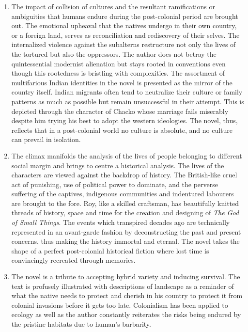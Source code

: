 \begin{enumerate}
  \item The impact of collision of cultures and the resultant ramifications or ambiguities that humans endure during the post-colonial period are brought out.  The emotional upheaval that the natives undergo in their own country, or a foreign land, serves as reconciliation and rediscovery of their selves.  The internalized violence against the subalterns restructure not only the lives of the tortured but also the oppressors. The author does not betray the quintessential modernist alienation but stays rooted in conventions even though this rootedness is bristling with complexities. The assortment of multifarious Indian identities in the novel is presented as the mirror of the country itself.  Indian migrants often tend to neutralize their culture or family patterns as much as possible but remain unsuccessful in their attempt. This is depicted through the character of Chacko whose marriage fails miserably despite him trying his best to adopt the western ideologies. The novel, thus, reflects that in a post-colonial world no culture is absolute, and no culture can prevail in isolation.

  \item The climax manifolds the analysis of the lives of people belonging to different social margin and brings to centre a historical analysis.  The lives of the characters are viewed against the backdrop of history.  The British-like cruel act of punishing, use of political power to dominate, and the perverse suffering of the captives, indigenous communities and indentured labourers are brought to the fore.  Roy, like a skilled craftsman, has beautifully knitted threads of history, space and time for the creation and designing of \emph{The God of Small Things}.  The events which transpired decades ago are technically represented in an avant-garde fashion by deconstructing the past and present concerns, thus making the history immortal and eternal. The novel takes the shape of a perfect post-colonial historical fiction where lost time is convincingly recreated through memories.

  \item The novel is a tribute to accepting hybrid variety and inducing survival.  The text is profusely illustrated with descriptions of landscape as a reminder of what the native needs to protect and cherish in his country to protect it from colonial invasions before it gets too late. Colonialism has been applied to ecology as well as the author constantly reiterates the risks being endured by the pristine habitats due to human’s barbarity.


\end{enumerate}

